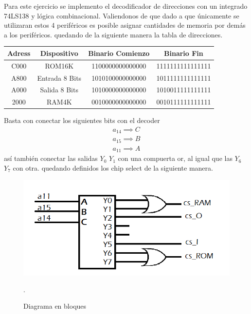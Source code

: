 


Para este ejercicio se implemento el decodificador de direcciones con un integrado 74LS138 y lógica combinacional.
Valiendonos de que dado a que únicamente se utilizaran estos 4 periféricos es posible asignar cantidades de memoria por demás a los periféricos.
quedando de la siguiente manera la tabla de direcciones.
\begin{table}[H]
\centering
\begin{tabular}{|c|c|c|c|}
\hline
Adress & Dispositivo & Binario Comienzo & Binario Fin \\ \hline
C000 & ROM16K & 1100000000000000 & 1111111111111111 \\ \hline
A800 & Entrada 8 Bits & 1010100000000000 & 1011111111111111 \\ \hline
A000 & Salida 8 Bits & 1010000000000000 & 1010011111111111 \\ \hline
2000 & RAM4K & 0010000000000000 & 0010111111111111 \\ \hline
\end{tabular}
\end{table}
Basta con conectar los siguientes bits con el decoder
\begin{align}
a_{14} \implies C\\
a_{15} \implies B\\
a_{11} \implies A
\end{align}
así también conectar las salidas $Y_0$ $Y_1$  con una compuerta or, al igual que las $Y_6$ $Y_7$ con otra.
quedando definidos los chip select de la siguiente manera.

\begin{figure}[H]
  \centering
  \includegraphics[width=.7\textwidth]{ImagenesEjercicio2/fotofea.png}
  \caption{Diagrama en bloques}.
  \label{fig:fotofea}
\end{figure}

